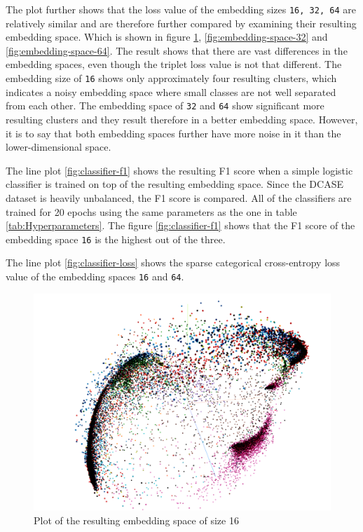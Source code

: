 \documentclass[twocolumn]{article}
\begin{document}
The plot further shows that the loss value of the embedding sizes \texttt{16, 32, 64} are relatively similar and are therefore further compared by examining their resulting embedding space. Which is shown in figure \ref{fig:embedding-space-16}, \ref{fig:embedding-space-32} and \ref{fig:embedding-space-64}. The result shows that there are vast differences in the embedding spaces, even though the triplet loss value is not that different. The embedding size of \texttt{16} shows only approximately four resulting clusters, which indicates a noisy embedding space where small classes are not well separated from each other. The embedding space of \texttt{32} and \texttt{64} show significant more resulting clusters and they result therefore in a better embedding space. However, it is to say that both embedding spaces further have more noise in it than the lower-dimensional space.

The line plot \ref{fig:classifier-f1} shows the resulting F1 score when a simple logistic classifier is trained on top of the resulting embedding space. Since the DCASE dataset is heavily unbalanced, the F1 score is compared. All of the classifiers are trained for 20 epochs using the same parameters as the one in table \ref{tab:Hyperparameters}. The figure \ref{fig:classifier-f1} shows that the F1 score of the embedding space \texttt{16} is the highest out of the three.

The line plot \ref{fig:classifier-loss} shows the sparse categorical cross-entropy loss value of the embedding spaces \texttt{16} and \texttt{64}.

\begin{figure}[t]
\centering
    \includegraphics[width=\linewidth]{assets/embedding_space_16.png}
    \caption{Plot of the resulting embedding space of size 16}
    \label{fig:embedding-space-16}
\end{figure}
\end{document}
